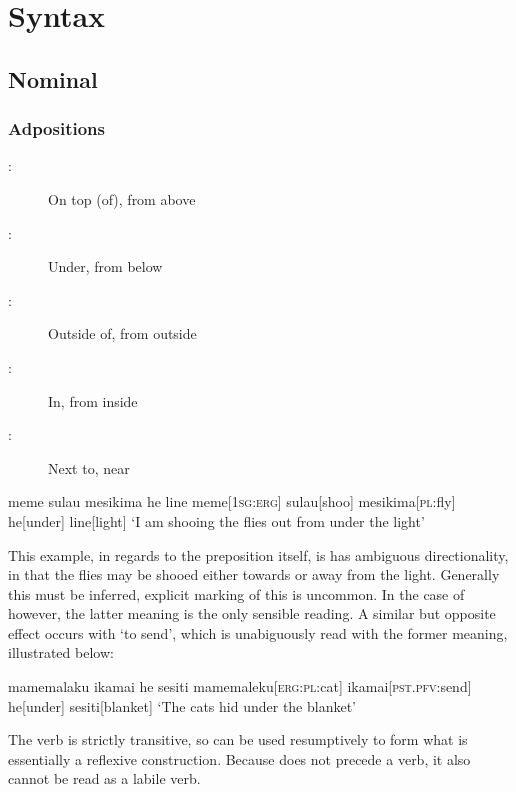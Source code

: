 \part{Syntax}

\chapter{Nominal}

\section{Adpositions}

\begin{description}
  \item[:] On top (of), from above
  \item[:] Under, from below
  \item[:] Outside of, from outside
  \item[:] In, from inside
  \item[:] Next to, near
\end{description}

\ex
\begingl
\glpreamble meme sulau mesikima he line
\endpreamble
meme[\textsc{1sg:erg}]
sulau[shoo]
mesikima[\textsc{pl:}fly]
he[under]
line[light]
\glft `I am shooing the flies out from under the light'
\endgl
\xe

This example, in regards to the preposition itself, is has ambiguous directionality, in that the flies may be shooed either towards or away from the light. Generally this must be inferred, explicit marking of this is uncommon. In the case of  however, the latter meaning is the only sensible reading. A similar but opposite effect occurs with  `to send', which is unabiguously read with the former meaning, illustrated below:

\ex
\begingl
\glpreamble mamemalaku ikamai he sesiti
\endpreamble
mamemaleku[\textsc{erg:pl:}cat]
ikamai[\textsc{pst.pfv:}send]
he[under]
sesiti[blanket]
\glft `The cats hid under the blanket'
\endgl
\xe

The verb  is strictly transitive, so  can be used resumptively to form what is essentially a reflexive construction. Because  does not precede a verb, it also cannot be read as a labile verb.

